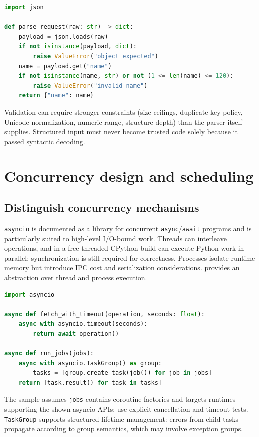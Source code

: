 \documentclass[
  11pt,
]{report}
\newcommand{\passthrough}[1]{#1}
\begin{document}
\begin{lstlisting}[language=Python]
import json

def parse_request(raw: str) -> dict:
    payload = json.loads(raw)
    if not isinstance(payload, dict):
        raise ValueError("object expected")
    name = payload.get("name")
    if not isinstance(name, str) or not (1 <= len(name) <= 120):
        raise ValueError("invalid name")
    return {"name": name}
\end{lstlisting}

Validation can require stronger constraints (size ceilings,
duplicate-key policy, Unicode normalization, numeric range, structure
depth) than the parser itself supplies. Structured input must never
become trusted code solely because it passed syntactic decoding.

\chapter{Concurrency design and
scheduling}\label{concurrency-design-and-scheduling}

\section{Distinguish concurrency
mechanisms}\label{distinguish-concurrency-mechanisms}

\passthrough{\lstinline!asyncio!} is documented as a library for
concurrent
\passthrough{\lstinline!async!}/\passthrough{\lstinline!await!} programs
and is particularly suited to high-level I/O-bound work. Threads can
interleave operations, and in a free-threaded CPython build can execute
Python work in parallel; synchronization is still required for
correctness. Processes isolate runtime memory but introduce IPC cost and
serialization considerations.
 provides an abstraction
over thread and process execution.

\begin{lstlisting}[language=Python]
import asyncio

async def fetch_with_timeout(operation, seconds: float):
    async with asyncio.timeout(seconds):
        return await operation()

async def run_jobs(jobs):
    async with asyncio.TaskGroup() as group:
        tasks = [group.create_task(job()) for job in jobs]
    return [task.result() for task in tasks]
\end{lstlisting}

The sample assumes \passthrough{\lstinline!jobs!} contains coroutine
factories and targets runtimes supporting the shown asyncio APIs; use
explicit cancellation and timeout tests.
\passthrough{\lstinline!TaskGroup!} supports structured lifetime
management: errors from child tasks propagate according to group
semantics, which may involve exception groups.
\end{document}
